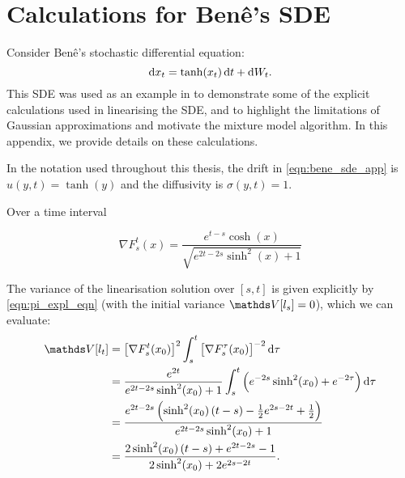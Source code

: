
\chapter{Calculations for Ben\^e's SDE}\label{app:bene_sde}
Consider Ben\^e's stochastic differential equation:
\begin{equation}
	\dif x_t = \tanh\!\left(x_t\right)\dif t + \dif W_t.
	\label{eqn:bene_sde_app}
\end{equation}
This SDE was used as an example in  to demonstrate some of the explicit calculations used in linearising the SDE, and to highlight the limitations of Gaussian approximations and motivate the mixture model algorithm.
In this appendix, we provide details on these calculations.


In the notation used throughout this thesis, the drift in \cref{eqn:bene_sde_app} is \(u\!\left(y,t\right) = \tanh\!\left(y\right)\) and the diffusivity is \(\sigma\!\left(y,t\right) = 1\).


Over a time interval \(\)

\[
	\nabla F_s^t\!\left(x\right) = \frac{e^{t-s}\cosh\!\left(x\right)}{\sqrt{e^{2t - 2s}\sinh^2\!\left(x\right) + 1}}
\]


The variance of the linearisation solution over \([s,t]\) is given explicitly by \cref{eqn:pi_expl_eqn} (with the initial variance \(\var{l_s} = 0\)), which we can evaluate:
\begin{align*}
	\var{l_t} & = \left[\nabla F_s^t\!\left(x_0\right)\right]^2\int_s^t{\left[\nabla F_s^\tau\!\left(x_0\right)\right]^{-2}\dif\tau}                        \\
	          & = \frac{e^{2t}}{e^{2t - 2s}\sinh^2\!\left(x_0\right) + 1}\int_s^t{\left(e^{- 2s}\sinh^2\!\left(x_0\right) + e^{- 2\tau}\right)\dif\tau}     \\
	          & = \frac{e^{2t - 2s}\left(\sinh^2\!\left(x_0\right)(t - s) - \frac12 e^{2s - 2t} + \frac12\right)}{e^{2t - 2s}\sinh^2\!\left(x_0\right) + 1} \\
	          & = \frac{2\sinh^2\!\left(x_0\right)\left(t - s\right) + e^{2t - 2s} - 1}{2\sinh^2\!\left(x_0\right) + 2e^{2s - 2t}}.
\end{align*}
